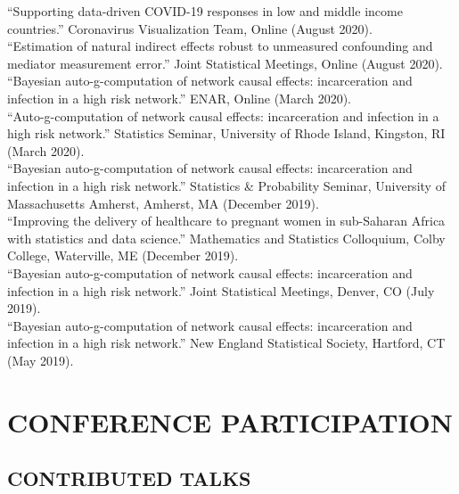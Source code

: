 \documentclass[12pt]{article}
\begin{document}

``Supporting data-driven COVID-19 responses in low and middle income countries.'' Coronavirus Visualization Team, Online (August 2020). \\

``Estimation of natural indirect effects robust to unmeasured confounding and mediator measurement error.'' Joint Statistical Meetings, Online (August 2020). \\

``Bayesian auto-g-computation of network causal effects: incarceration and infection in a high risk network.'' ENAR, Online (March 2020). \\

``Auto-g-computation of network causal effects: incarceration and infection in a high risk network.'' Statistics Seminar, University of Rhode Island, Kingston, RI (March 2020). \\

``Bayesian auto-g-computation of network causal effects: incarceration and infection in a high risk network.'' Statistics \& Probability Seminar, University of Massachusetts Amherst, Amherst, MA (December 2019). \\

``Improving the delivery of healthcare to pregnant women in sub-Saharan Africa with statistics and data science.'' Mathematics and Statistics Colloquium, Colby College, Waterville, ME (December 2019). \\ 

``Bayesian auto-g-computation of network causal effects: incarceration and infection in a high risk network.'' Joint Statistical Meetings, Denver, CO (July 2019). \\

``Bayesian auto-g-computation of network causal effects: incarceration and infection in a high risk network.'' New England Statistical Society, Hartford, CT (May 2019). 

\section*{\textbf{{\large C}{ONFERENCE} {\large P}{ARTICIPATION}}}  

\subsection*{\textbf{CONTRIBUTED TALKS}}
\end{document}
